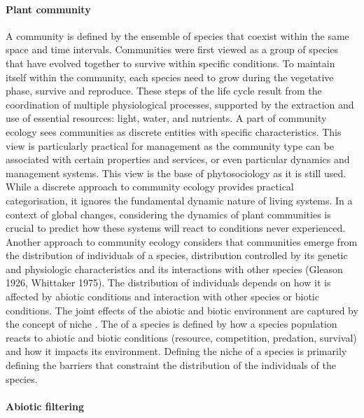 \paragraph{Plant community}

A community is defined by the ensemble of species that coexist within the same space and time intervals. Communities were first viewed as a group of species that have evolved together to survive within specific conditions. To maintain itself within the community, each species need to grow during the vegetative phase, survive and reproduce. These steps of the life cycle result from the coordination of multiple physiological processes, supported by the extraction and use of essential resources: light, water, and nutrients. A part of community ecology sees communities as discrete entities with specific characteristics. This view is particularly practical for management as the community type can be associated with certain properties and services, or even particular dynamics and management systems. This view is the base of phytosociology as it is still used. While a discrete approach to community ecology provides practical categorisation, it ignores the fundamental dynamic nature of living systems. In a context of global changes, considering the dynamics of plant communities is crucial to predict how these systems will react to conditions never experienced. Another approach to community ecology considers that communities emerge from the distribution of individuals of a species, distribution controlled by its genetic and physiologic characteristics and its interactions with other species (Gleason 1926, Whittaker 1975). The distribution of individuals depends on how it is affected by abiotic conditions and interaction with other species or biotic conditions. The joint effects of the abiotic and biotic environment are captured by the concept of niche \parencite{elton_1927}. The  of a species is defined by how a species population reacts to abiotic and biotic conditions (resource, competition, predation, survival) and how it impacts its environment. Defining the niche of a species is primarily defining the barriers that constraint the distribution of the individuals of the species.

\paragraph{Abiotic filtering}

